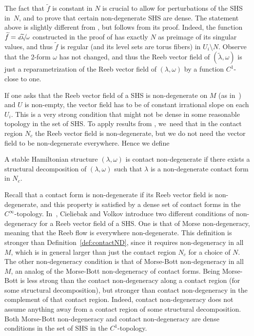 The fact that $\widetilde f$ is constant in $N$ is crucial to allow for perturbations of the SHS in~$N$, and to prove that certain non-degenerate SHS are dense. The statement above is slightly different from \cite[Th.\,4.1]{CV1}, but follows from its proof. Indeed, the function $\widetilde f=\sfrac{d\widetilde \lambda}{\omega}$ constructed in the proof of \cite[Th.\,4.1]{CV1} has exactly $N$ as preimage of its singular values, and thus $\tilde f$ is regular (and its level sets are torus fibers) in $U_i\setminus N$. Observe that the 2-form $\omega$ has not changed, and thus the Reeb vector field of $(\widetilde \lambda,\omega)$ is just a reparametrization of the Reeb vector field of $(\lambda,\omega)$ by a function $C^1$-close to one.

If one asks that the Reeb vector field of a SHS is non-degenerate on $M$ (\eg as in~\cite{MS}) and $U$ is non-empty, the vector field has to be of constant irrational slope on each $U_i$. This is a very strong condition that might not be dense in some reasonable topology in the set of SHS. To apply results from \cite{CDR}, we~need that in the contact region $N_c$ the Reeb vector field is non-degenerate, but we do not need the vector field to be non-degenerate everywhere. Hence we define

\begin{defi}\label{def:contactND}
A stable Hamiltonian structure $(\lambda,\omega)$ is contact non-degenerate if there exists a structural decomposition of $(\lambda,\omega)$ such that $\lambda$ is a non-degenerate contact form in $N_c$.
\end{defi}

Recall that a contact form is non-degenerate if its Reeb vector field is non-degenerate, and this property is satisfied by a dense set of contact forms in the $C^\infty$-topology. In~\cite[p.\,375]{CV1}, Cieliebak and Volkov introduce two different conditions of non-degeneracy for a Reeb vector field of a SHS. One is that of Morse non-degeneracy, meaning that the Reeb flow is everywhere non-degenerate. This definition is stronger than Definition~\ref{def:contactND}, since it requires non-degeneracy in all $M$, which is in general larger than just the contact region $N_c$ for a choice of $N$. The other non-degeneracy condition is that of Morse-Bott non-degeneracy in all $M$, an analog of the Morse-Bott non-degeneracy of contact forms. Being Morse-Bott is less strong than the contact non-degeneracy along a contact region (for some structural decomposition), but stronger than contact non-degeneracy in the complement of that contact region. Indeed, contact non-degeneracy does not assume anything away from a contact region of some structural decomposition. Both Morse-Bott non-degeneracy and contact non-degeneracy are dense conditions in the set of SHS in the $C^1$-topology.

